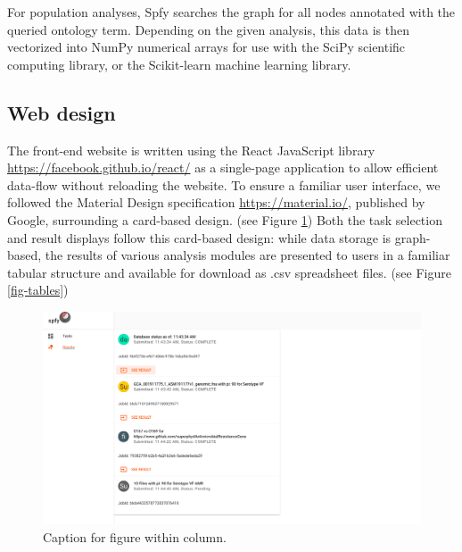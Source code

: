 \documentclass{article}
\begin{document}
For population analyses, Spfy searches the graph for all nodes annotated with the queried ontology term. Depending on the given analysis, this data is then vectorized into NumPy numerical arrays for use with the SciPy scientific computing library, or the Scikit-learn machine learning library.

\subsection{Web design}

The front-end website is written using the React JavaScript library \url{https://facebook.github.io/react/} as a single-page application to allow efficient data-flow without reloading the website.
To ensure a familiar user interface, we followed the Material Design specification \url{https://material.io/}, published by Google, surrounding a card-based design.
(see Figure \ref{fig-results})
Both the task selection and result displays follow this card-based design: while data storage is graph-based, the results of various analysis modules are presented to users in a familiar tabular structure and available for download as .csv spreadsheet files.
(see Figure \ref{fig-tables})

\begin{figure}[t]
\begin{center}
\includegraphics[width=\textwidth]{images/results.png}
\end{center}
\caption{Caption for figure within column.}
\label{fig-results}
\end{figure}
\end{document}
